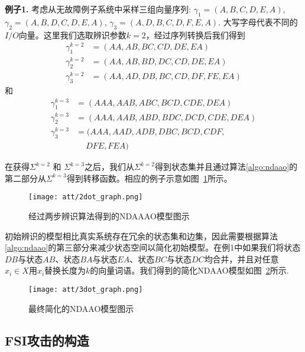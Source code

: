 \textbf{例子1.} 考虑从无故障例子系统中采样三组向量序列: $\gamma_1=(A,B,C,D,E,A)$, $\gamma_2=(A,B,D,C,D,E,A)$, $\gamma_3=(A,D,B,C,D,F,E,A)$. 大写字母代表不同的$I/O$向量。这里我们选取辨识参数$k=2$，经过序列转换后我们得到 \[\begin{split} \gamma_1^{k=2}&=(AA,AB,BC,CD,DE,EA)\\ \gamma_2^{k=2}&=(AA,AB,BD,DC,CD,DE,EA)\\\gamma_3^{k=2}&=(AA,AD,DB,BC,CD,DF,FE,EA) \end{split}\] 和 \[\begin{split} \gamma_1^{k=3}&=(AAA,AAB,ABC,BCD,CDE,DEA)\\ \gamma_2^{k=3}&=(AAA,AAB,ABD,BDC,DCD,CDE,DEA)\\\gamma_3^{k=3}&=(AAA,AAD,ADB,DBC,BCD,CDF,\\&\quad \ DFE,FEA) \end{split}\]

在获得$\Sigma^{k=2}$ 和 $\Sigma^{k=3}$之后，我们从$\Sigma^{k=2}$得到状态集并且通过算法\ref{algo:ndaao}的第二部分从$\Sigma^{k=3}$得到转移函数。相应的例子示意如图~\ref{fig5}所示。

\begin{figure}[!htb]
  \centering
  \texttt{[image: att/2dot\_graph.png]}
  \caption{经过两步辨识算法得到的NDAAAO模型图示}
  \label{fig5}
\end{figure}

初始辨识的模型相比真实系统存在冗余的状态集和边集，因此需要根据算法\ref{algo:ndaao}的第三部分来减少状态空间以简化初始模型。在例1中如果我们将状态$ DB $与状态$ AB $、状态$ BA $与状态$ EA $、状态$ BC $与状态$ DC $均合并，并且对任意$x_i \in X$用$x_i$替换长度为$k$的向量词语。我们得到的简化NDAAO模型如图~\ref{fig6}所示.

\begin{figure}[!htb]{}
  \centering
  \texttt{[image: att/3dot\_graph.png]}
  \caption{最终简化的NDAAO模型图示}
  \label{fig6}
\end{figure}

\subsection{FSI攻击的构造}

